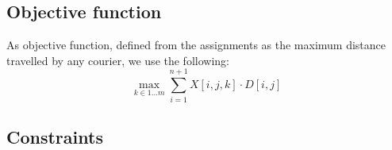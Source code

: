 \subsection{Objective function}
As objective function, defined from the assignments as the maximum distance travelled by any courier, we use the following: 
\begin{equation}
    \max_{k \in 1 \dots m}\sum_{i = 1}^{n+1} X[i,j,k] \cdot D[i,j]
\end{equation}

\subsection{Constraints}

